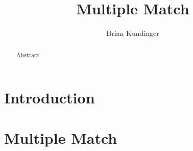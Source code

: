 \documentclass[12pt,letterpaper]{article}
\title{Multiple Match}
\author{Brian Kundinger}
\newcommand{\1}[1]{\mathbb{I}\!\left[#1\right]} %
\def\spacingset#1{\renewcommand{\baselinestretch}%
  {#1}\small\normalsize} \spacingset{1}
\begin{document}
\maketitle

\bigskip
\begin{abstract}
Abstract
\end{abstract}

\newpage
\spacingset{1.5}

\section{Introduction}



\section{Multiple Match}
\end{document}
